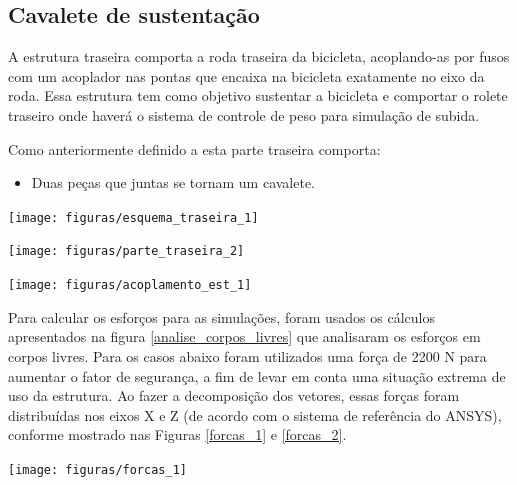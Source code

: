 \subsection{Cavalete de sustentação}

    A estrutura traseira comporta a roda traseira da bicicleta, acoplando-as por fusos com um acoplador nas pontas que encaixa na bicicleta exatamente no eixo da roda. Essa estrutura tem como objetivo sustentar a bicicleta e comportar o rolete traseiro onde haverá o sistema de controle de peso para simulação de subida.

    Como anteriormente definido a esta parte traseira comporta:
    \begin{itemize}
        \item Duas peças que juntas se tornam um cavalete.
    \end{itemize}
    
    \begin{center}
    	\texttt{[image: figuras/esquema\_traseira\_1]}
        \label{esquema_traseira_1}
    \end{center}    

    \begin{center}
    	\texttt{[image: figuras/parte\_traseira\_2]}
        \label{parte_traseira_2}
    \end{center}        
   
    \begin{center}
    	\texttt{[image: figuras/acoplamento\_est\_1]}
        \label{acoplamento_est_1}
    \end{center}      
  
    Para calcular os esforços para as simulações, foram usados os cálculos apresentados na figura \ref{analise_corpos_livres} que analisaram os esforços em corpos livres. Para os casos abaixo foram utilizados uma força de 2200 N para aumentar o fator de segurança, a fim de levar em conta uma situação extrema de uso da estrutura. Ao fazer a decomposição dos vetores, essas forças foram distribuídas nos eixos X e Z (de acordo com o sistema de referência do ANSYS), conforme mostrado nas Figuras \ref{forcas_1} e \ref{forcas_2}.

    \begin{center}
    	\texttt{[image: figuras/forcas\_1]}
        \label{forcas_1}
    \end{center}   
    
